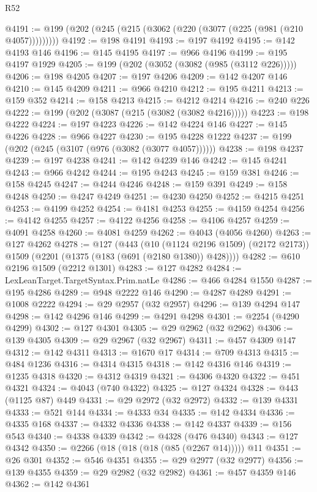 \begin{lexlean}{R52}
\begin{coremodule}
{{{{{{{{{{{{{{{{{{{{{{{{{{{{{{{{{{{{{{{{{{{{{{{{{{{{{{{{{{{{{{{{{{{{{{{{{{{{{{{{{{{{{{{{{{{{{{{{{{{{{{{{{{{{{{{{{{{{{{{{{{{{{{{{{{{{{{{{{{{{{{{{{{{{{{{{{{{{{{{{{{{{{{{{{{{{{{{{{{{{{{{{{{{{{{{{{{{{{{@4191 := @199 (@202 (@245 (@215 (@3062 (@220 (@3077 (@225 (@981 (@210 @4057)))))))))
@4192 := @198 @4191
@4193 := @197 @4192
@4195 := @142 @4193 @146
@4196 := @145 @4195
@4197 := @966 @4196
@4199 := @195 @4197 @1929
@4205 := @199 (@202 (@3052 (@3082 (@985 (@3112 @226)))))
@4206 := @198 @4205
@4207 := @197 @4206
@4209 := @142 @4207 @146
@4210 := @145 @4209
@4211 := @966 @4210
@4212 := @195 @4211
@4213 := @159 @352
@4214 := @158 @4213
@4215 := @4212 @4214
@4216 := @240 @226
@4222 := @199 (@202 (@3087 (@215 (@3082 (@3082 @4216)))))
@4223 := @198 @4222
@4224 := @197 @4223
@4226 := @142 @4224 @146
@4227 := @145 @4226
@4228 := @966 @4227
@4230 := @195 @4228 @1222
@4237 := @199 (@202 (@245 (@3107 (@976 (@3082 (@3077 @4057))))))
@4238 := @198 @4237
@4239 := @197 @4238
@4241 := @142 @4239 @146
@4242 := @145 @4241
@4243 := @966 @4242
@4244 := @195 @4243
@4245 := @159 @381
@4246 := @158 @4245
@4247 := @4244 @4246
@4248 := @159 @391
@4249 := @158 @4248
@4250 := @4247 @4249
@4251 := @4230 @4250
@4252 := @4215 @4251
@4253 := @4199 @4252
@4254 := @4181 @4253
@4255 := @4159 @4254
@4256 := @4142 @4255
@4257 := @4122 @4256
@4258 := @4106 @4257
@4259 := @4091 @4258
@4260 := @4081 @4259
@4262 := @4043 (@4056 @4260)
@4263 := @127 @4262
@4278 := @127
    (@443
      (@10 (@1124 @2196 @1509) (@2172 @2173))
      @1509
      (@2201 (@1375 (@183 (@691 (@2180 @1380)) @428))))
@4282 := @610 @2196 @1509 (@2212 @1301)
@4283 := @127 @4282
@4284 := LexLeanTarget.TargetSyntax.Prim.natLe
@4286 := @466 @4284 @1550
@4287 := @195 @4286
@4289 := @948 @2222 @146
@4290 := @4287 @4289
@4291 := @1008 @2222
@4294 := @29 @2957 (@32 @2957)
@4296 := @139 @4294 @147
@4298 := @142 @4296 @146
@4299 := @4291 @4298
@4301 := @2254 (@4290 @4299)
@4302 := @127 @4301
@4305 := @29 @2962 (@32 @2962)
@4306 := @139 @4305
@4309 := @29 @2967 (@32 @2967)
@4311 := @457 @4309 @147
@4312 := @142 @4311
@4313 := @1670 @17
@4314 := @709 @4313
@4315 := @484 @1236
@4316 := @4314 @4315
@4318 := @142 @4316 @146
@4319 := @1235 @4318
@4320 := @4312 @4319
@4321 := @4306 @4320
@4322 := @451 @4321
@4324 := @4043 (@740 @4322)
@4325 := @127 @4324
@4328 := @443 (@1125 @87) @449
@4331 := @29 @2972 (@32 @2972)
@4332 := @139 @4331
@4333 := @521 @144
@4334 := @4333 @34
@4335 := @142 @4334
@4336 := @4335 @168
@4337 := @4332 @4336
@4338 := @142 @4337
@4339 := @156 @543
@4340 := @4338 @4339
@4342 := @4328 (@476 @4340)
@4343 := @127 @4342
@4350 := @2266 (@18 (@18 (@18 (@85 (@2267 @14))))) @11
@4351 := @26 @301
@4352 := @546 @4351
@4355 := @29 @2977 (@32 @2977)
@4356 := @139 @4355
@4359 := @29 @2982 (@32 @2982)
@4361 := @457 @4359 @146
@4362 := @142 @4361
}}}}}}}}}}}}}}}}}}}}}}}}}}}}}}}}}}}}}}}}}}}}}}}}}}}}}}}}}}}}}}}}}}}}}}}}}}}}}}}}}}}}}}}}}}}}}}}}}}}}}}}}}}}}}}}}}}}}}}}}}}}}}}}}}}}}}}}}}}}}}}}}}}}}}}}}}}}}}}}}}}}}}}}}}}}}}}}}}}}}}}}}}}}}}}}}}}}}}}
\end{coremodule}
\end{lexlean}
